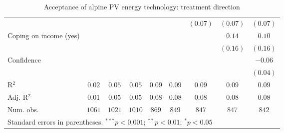 \begin{table}[h]
\begin{center}
\begin{tabular}{l c c c c c c c c}
                                                                                &              &              &              &               &               & $(0.07)$      & $(0.07)$      & $(0.07)$      \\
Coping on income (yes)                                                          &              &              &              &               &               &               & $0.14$        & $0.10$        \\
                                                                                &              &              &              &               &               &               & $(0.16)$      & $(0.16)$      \\
Confidence                                                                      &              &              &              &               &               &               &               & $-0.06$       \\
                                                                                &              &              &              &               &               &               &               & $(0.04)$      \\
\hline
R$^2$                                                                           & $0.02$       & $0.05$       & $0.05$       & $0.09$        & $0.09$        & $0.09$        & $0.09$        & $0.09$        \\
Adj. R$^2$                                                                      & $0.01$       & $0.05$       & $0.05$       & $0.08$        & $0.08$        & $0.08$        & $0.08$        & $0.08$        \\
Num. obs.                                                                       & $1061$       & $1021$       & $1010$       & $869$         & $849$         & $847$         & $847$         & $842$         \\
\hline
\multicolumn{9}{l}{\scriptsize{Standard errors in parentheses. $^{***}p<0.001$; $^{**}p<0.01$; $^{*}p<0.05$}}
\end{tabular}
\caption{Acceptance of alpine PV energy technology: treatment direction}
\label{table:acceptance_alpine_pv_treatment_direction}
\end{center}
\end{table}
